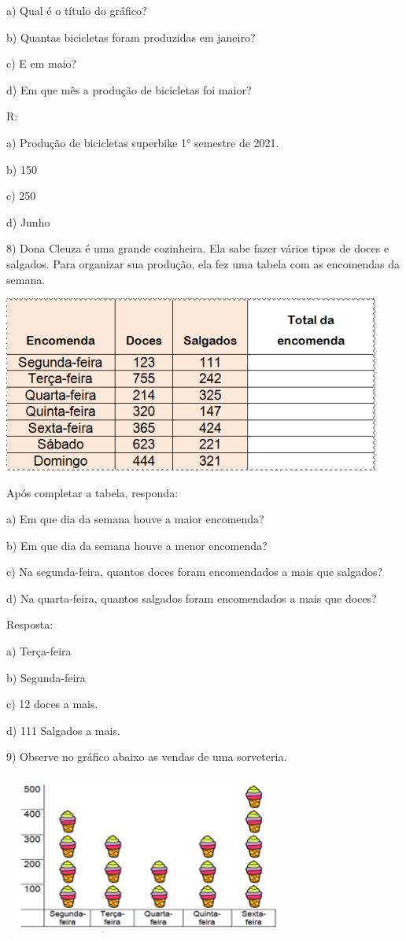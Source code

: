 a) Qual é o título do gráfico?

b) Quantas bicicletas foram produzidas em janeiro?

c) E em maio?

d) Em que mês a produção de bicicletas foi maior?

R:

a) Produção de bicicletas superbike 1° semestre de 2021.

b) 150

c) 250

d) Junho

8) Dona Cleuza é uma grande cozinheira. Ela sabe fazer vários tipos de
doces e salgados. Para organizar sua produção, ela fez uma tabela com as
encomendas da semana.

\includegraphics[width=4.88403in,height=2.27917in]{./imgSAEB_6_MAT/media/image86.png}

Após completar a tabela, responda:

a) Em que dia da semana houve a maior encomenda?

b) Em que dia da semana houve a menor encomenda?

c) Na segunda-feira, quantos doces foram encomendados a mais que
salgados?

d) Na quarta-feira, quantos salgados foram encomendados a mais que
doces?

Resposta:

a) Terça-feira

b) Segunda-feira

c) 12 doces a mais.

d) 111 Salgados a mais.

9) Observe no gráfico abaixo as vendas de uma sorveteria.

\includegraphics[width=3.7in,height=2.1in]{./imgSAEB_6_MAT/media/image87.png}

